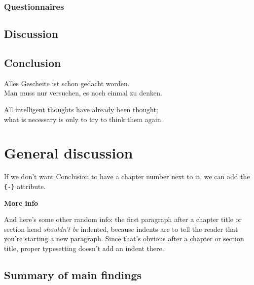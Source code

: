 \documentclass[a4paper, twoside]{templates/ociamthesis}
\begin{document}
\hypertarget{questionnaires-1}{%
\subsection{Questionnaires}\label{questionnaires-1}}

\hypertarget{discussion-4}{%
\section{Discussion}\label{discussion-4}}

\hypertarget{conclusion-2}{%
\section{Conclusion}\label{conclusion-2}}

\clearpage

\begin{savequote}
Alles Gescheite ist schon gedacht worden.\\
Man muss nur versuchen, es noch einmal zu denken.

All intelligent thoughts have already been thought;\\
what is necessary is only to try to think them again.
\end{savequote}



\hypertarget{general-discussion}{%
\chapter*{General discussion}\label{general-discussion}}

If we don't want Conclusion to have a chapter number next to it, we can add the \texttt{\{-\}} attribute.

\textbf{More info}

And here's some other random info: the first paragraph after a chapter title or section head \emph{shouldn't be} indented, because indents are to tell the reader that you're starting a new paragraph. Since that's obvious after a chapter or section title, proper typesetting doesn't add an indent there.

\hypertarget{summary-of-main-findings}{%
\section*{Summary of main findings}\label{summary-of-main-findings}}
\end{document}
